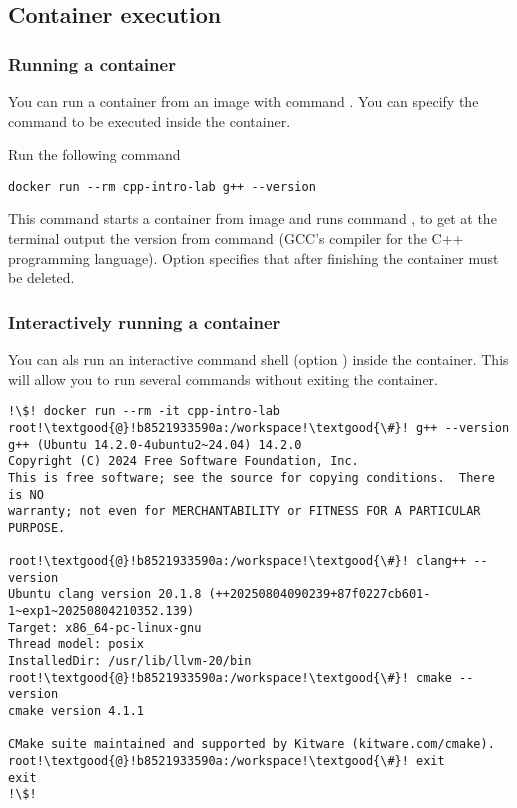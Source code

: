 \subsection{Container execution}

\subsubsection{Running a container}

You can run a container from an image with command
. 
You can specify the command to be executed inside the container.

Run the following command

\begin{lstlisting}[style=terminal]
docker run --rm cpp-intro-lab g++ --version
\end{lstlisting}

This command starts a container from image 
and runs command , 
to get at the terminal output the version from command  
(GCC's compiler for the C++ programming language).
Option 
specifies that after finishing the container must be deleted.

\subsubsection{Interactively running a container}

You can als run an interactive command shell
(option ) inside the container.
This will allow you to run several commands without exiting the container.

\begin{lstlisting}[style=terminal,escapechar=!]
!\$! docker run --rm -it cpp-intro-lab
root!\textgood{@}!b8521933590a:/workspace!\textgood{\#}! g++ --version
g++ (Ubuntu 14.2.0-4ubuntu2~24.04) 14.2.0
Copyright (C) 2024 Free Software Foundation, Inc.
This is free software; see the source for copying conditions.  There is NO
warranty; not even for MERCHANTABILITY or FITNESS FOR A PARTICULAR PURPOSE.

root!\textgood{@}!b8521933590a:/workspace!\textgood{\#}! clang++ --version
Ubuntu clang version 20.1.8 (++20250804090239+87f0227cb601-1~exp1~20250804210352.139)
Target: x86_64-pc-linux-gnu
Thread model: posix
InstalledDir: /usr/lib/llvm-20/bin
root!\textgood{@}!b8521933590a:/workspace!\textgood{\#}! cmake --version
cmake version 4.1.1

CMake suite maintained and supported by Kitware (kitware.com/cmake).
root!\textgood{@}!b8521933590a:/workspace!\textgood{\#}! exit
exit
!\$!
\end{lstlisting}

